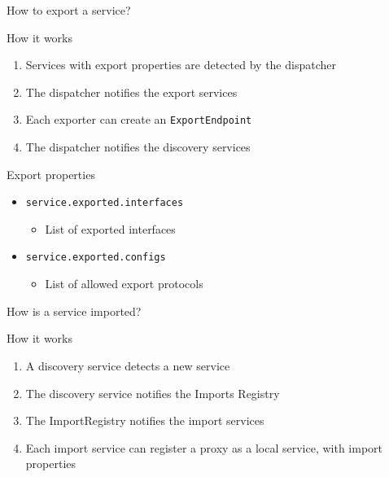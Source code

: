 \begin{frame}{How to export a service?}
\begin{block}{How it works}
\begin{enumerate}
\item Services with export properties are detected by the dispatcher
\item The dispatcher notifies the export services
\item Each exporter can create an \texttt{ExportEndpoint}
\item The dispatcher notifies the discovery services
\end{enumerate}
\end{block}

\begin{block}{Export properties}
\begin{itemize}
\item[] \texttt{\small service.exported.interfaces}
\begin{itemize}
\vspace{-.2em}
\item[] List of exported interfaces
\end{itemize}
\item[] \texttt{\small service.exported.configs}
\begin{itemize}
\vspace{-.2em}
\item[] List of allowed export protocols
\end{itemize}
\end{itemize}
\end{block}
\end{frame}

\begin{frame}{How is a service imported?}
\begin{block}{How it works}
\begin{enumerate}
\item A discovery service detects a new service
\item The discovery service notifies the Imports Registry
\item The ImportRegistry notifies the import services
\item Each import service can register a proxy as a local service, with import properties
\end{enumerate}
\end{block}
\end{frame}

